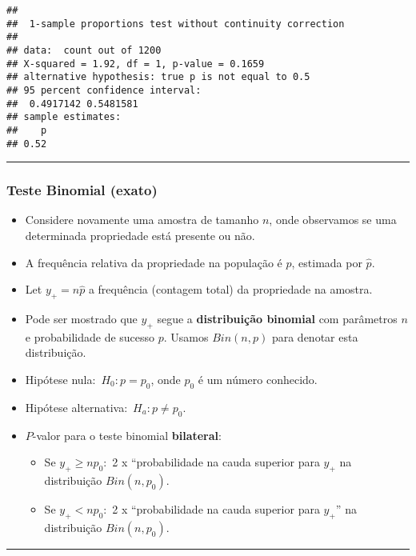 \documentclass[]{article}
\providecommand{\tightlist}{%
  \setlength{\itemsep}{0pt}\setlength{\parskip}{0pt}}
\begin{document}
\begin{verbatim}
## 
##  1-sample proportions test without continuity correction
## 
## data:  count out of 1200
## X-squared = 1.92, df = 1, p-value = 0.1659
## alternative hypothesis: true p is not equal to 0.5
## 95 percent confidence interval:
##  0.4917142 0.5481581
## sample estimates:
##    p 
## 0.52
\end{verbatim}

\begin{center}\rule{0.5\linewidth}{\linethickness}\end{center}

\subsubsection{Teste Binomial (exato)}\label{teste-binomial-exato}

\begin{itemize}
\tightlist
\item
  Considere novamente uma amostra de tamanho \(n\), onde observamos se
  uma determinada propriedade está presente ou não.
\item
  A frequência relativa da propriedade na população é \(p\), estimada
  por \(\hat{p}\).
\item
  Let \(y_+=n\hat{p}\) a frequência (contagem total) da propriedade na
  amostra.
\item
  Pode ser mostrado que \(y_+\) segue a \textbf{distribuição binomial}
  com parâmetros \(n\) e probabilidade de sucesso \(p\). Usamos
  \(Bin(n,p)\) para denotar esta distribuição.
\item
  Hipótese nula:~\(H_0: p=p_0\), onde \(p_0\) é um número conhecido.
\item
  Hipótese alternativa:~\(H_a: p \neq p_0\).
\item
  \(P\)-valor para o teste binomial \textbf{bilateral}:

  \begin{itemize}
  \tightlist
  \item
    Se \(y_+\geq np_0\):~2 x ``probabilidade na cauda superior para
    \(y_+\) na distribuição \(Bin(n,p_0)\).
  \item
    Se \(y_+< np_0\):~2 x ``probabilidade na cauda superior para
    \(y_+\)'' na distribuição \(Bin(n,p_0)\).
  \end{itemize}
\end{itemize}

\begin{center}\rule{0.5\linewidth}{\linethickness}\end{center}
\end{document}
